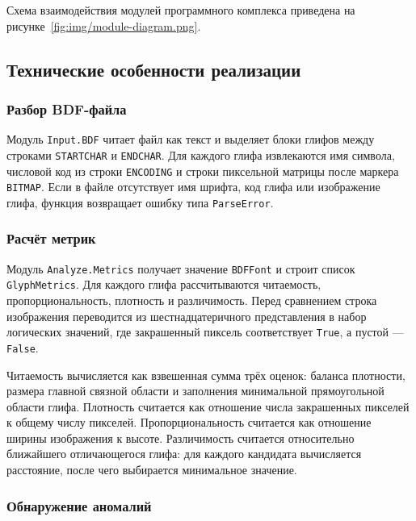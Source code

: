 Схема взаимодействия модулей программного комплекса приведена на рисунке~\ref{fig:img/module-diagram.png}.

\clearpage
{}
\label{fig:img/module-diagram.png}


\subsection{Технические особенности реализации}

\subsubsection{Разбор BDF-файла}

Модуль \texttt{Input.BDF} читает файл как текст и выделяет блоки глифов между строками \texttt{STARTCHAR} и \texttt{ENDCHAR}. Для каждого глифа извлекаются имя символа, числовой код из строки \texttt{ENCODING} и строки пиксельной матрицы после маркера \texttt{BITMAP}. Если в файле отсутствует имя шрифта, код глифа или изображение глифа, функция возвращает ошибку типа \texttt{ParseError}.

\subsubsection{Расчёт метрик}

Модуль \texttt{Analyze.Metrics} получает значение \texttt{BDFFont} и строит список \texttt{GlyphMetrics}. Для каждого глифа рассчитываются читаемость, пропорциональность, плотность и различимость. Перед сравнением строка изображения переводится из шестнадцатеричного представления в набор логических значений, где закрашенный пиксель соответствует \texttt{True}, а пустой --- \texttt{False}.

Читаемость вычисляется как взвешенная сумма трёх оценок: баланса плотности, размера главной связной области и заполнения минимальной прямоугольной области глифа. Плотность считается как отношение числа закрашенных пикселей к общему числу пикселей. Пропорциональность считается как отношение ширины изображения к высоте. Различимость считается относительно ближайшего отличающегося глифа: для каждого кандидата вычисляется расстояние, после чего выбирается минимальное значение.

\subsubsection{Обнаружение аномалий}

